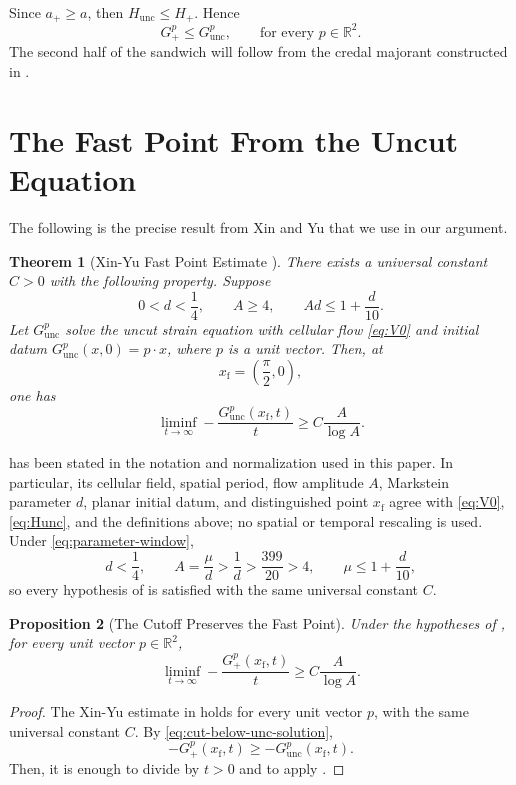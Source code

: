 \documentclass[11pt,reqno,noamsfonts]{amsart}
\newtheorem{theorem}{Theorem}[section]
\newtheorem{proposition}[theorem]{Proposition}
\theoremstyle{definition}
\theoremstyle{remark}
\newcommand{\Hunc}{H_{\mathrm{unc}}}
\newcommand{\Hcut}{H_{+}}
\newcommand{\Gunc}{G_{\mathrm{unc}}}
\begin{document}
Since $a_+\ge a$, then $\Hunc\le\Hcut$. Hence
\begin{equation}\label{eq:cut-below-unc-solution}
  G_+^p\le G_{\mathrm{unc}}^p,
  \qquad\text{for every }p\in\mathbb R^2.
\end{equation}
The second half of the sandwich will follow from the credal majorant constructed in .

\section{The Fast Point From the Uncut Equation}\label{sec:fast}

The following is the precise result  from Xin and Yu that we use in our argument.

\begin{theorem}[Xin-Yu Fast Point Estimate {\cite[Theorem~1.3(ii)]{XinYu2014}}]
\label{thm:xinyu}
There exists a universal constant $C>0$ with the following property.  Suppose
\[
  0<d<\frac14,
  \qquad
  A\ge4,
  \qquad
  Ad\le1+\frac d{10}.
\]
Let $\Gunc^p$ solve the uncut strain equation with cellular flow \eqref{eq:V0} and initial datum $\Gunc^p(x,0)=p\cdot x$, where $p$ is a unit vector.  Then, at
\[
  x_{\mathrm f}=\left(\frac\pi2,0\right),
\]
one has
\[
  \liminf_{t\to\infty}
  -\frac{\Gunc^p(x_{\mathrm f},t)}t
  \ge C\frac A{\log A}.
\]
\end{theorem}

 has been stated in the notation and normalization
used in this paper. In particular, its cellular field, spatial period,
flow amplitude $A$, Markstein parameter $d$, planar initial datum, and
distinguished point $x_{\mathrm f}$ agree with
\eqref{eq:V0}, \eqref{eq:Hunc}, and the definitions above; no spatial
or temporal rescaling is used. Under \eqref{eq:parameter-window},
\[
  d<\frac14,
  \qquad
  A=\frac\mu d>\frac1d>\frac{399}{20}>4,
  \qquad
  \mu\le1+\frac d{10},
\]
so every hypothesis of  is satisfied with the same
universal constant $C$.

\begin{proposition}[The Cutoff Preserves the Fast Point]
\label{prop:fast-cutoff}
Under the hypotheses of , for every unit vector
$p\in\mathbb R^2$,
\[
  \liminf_{t\to\infty}
  -\frac{G_+^p(x_{\mathrm f},t)}t
  \ge C\frac A{\log A}.
\]
\end{proposition}

\begin{proof}
The Xin-Yu estimate in  holds for every unit vector $p$,
with the same universal constant $C$. By
\eqref{eq:cut-below-unc-solution},
\[
  -G_+^p(x_{\mathrm f},t)
  \ge -G_{\mathrm{unc}}^p(x_{\mathrm f},t).
\]
Then, it is enough to divide by $t>0$ and to apply .
\end{proof}
\end{document}
